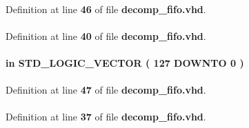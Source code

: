 Definition at line {\bf 46} of file {\bf decomp\+\_\+fifo.\+vhd}.

\paragraph[{altera\+\_\+mf}]{\hspace{0.3cm}{\ttfamily [Library]}}\label{classdecomp__fifo_ad57cd8d31a38ff87ac163fb47757ffbf}


Definition at line {\bf 40} of file {\bf decomp\+\_\+fifo.\+vhd}.

\paragraph[{data}]{ {\bfseries \textcolor{keywordflow}{in}\textcolor{vhdlchar}{ }} {\bfseries \textcolor{comment}{S\+T\+D\+\_\+\+L\+O\+G\+I\+C\+\_\+\+V\+E\+C\+T\+OR}\textcolor{vhdlchar}{ }\textcolor{vhdlchar}{(}\textcolor{vhdlchar}{ }\textcolor{vhdlchar}{ } \textcolor{vhdldigit}{127} \textcolor{vhdlchar}{ }\textcolor{keywordflow}{D\+O\+W\+N\+TO}\textcolor{vhdlchar}{ }\textcolor{vhdlchar}{ } \textcolor{vhdldigit}{0} \textcolor{vhdlchar}{ }\textcolor{vhdlchar}{)}\textcolor{vhdlchar}{ }} \hspace{0.3cm}{\ttfamily [Port]}}\label{classdecomp__fifo_a7646b5fc111ab507e5576c36fef63f29}


Definition at line {\bf 47} of file {\bf decomp\+\_\+fifo.\+vhd}.

\paragraph[{ieee}]{\hspace{0.3cm}{\ttfamily [Library]}}\label{classdecomp__fifo_a0a6af6eef40212dbaf130d57ce711256}


Definition at line {\bf 37} of file {\bf decomp\+\_\+fifo.\+vhd}.

